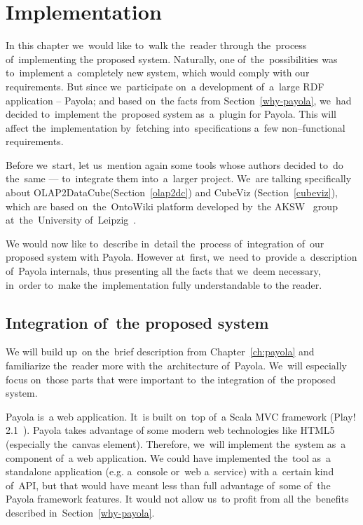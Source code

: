 \chapter{Implementation}
\label{ch:implementation}
In this chapter we~would like to~walk the~reader through the~process of~implementing 
the proposed system. Naturally, one of~the~possibilities was to~implement a~completely new system, 
which would comply with our requirements. But since we~participate on~a development of~a~large RDF
application -- Payola; and based on~the facts from
Section~\ref{why-payola}, we~had decided to~implement the~proposed system as~a~plugin
for Payola. This will affect the~implementation by~fetching into~specifications a~few non--functional
requirements.

Before we~start, let us~mention again some tools whose authors decided to~do the~same --- to~integrate them into~a~larger project. We~are talking specifically about 
OLAP2DataCube(Section~\ref{olap2dc}) and CubeViz (Section~\ref{cubeviz}),
which are based on~the~OntoWiki platform developed by~the AKSW~\cite{aksw} group at~the~University of~Leipzig~\cite{leipzich-uni}.

We would now like to~describe in~detail the~process of~integration of~our proposed system with
Payola. However at~first, we~need to~provide a~description of~Payola internals, thus presenting all
the facts that we~deem necessary, in~order to~make the~implementation fully understandable to
the reader.

\section{Integration of~the proposed system}
We will build up~on the~brief description from Chapter~\ref{ch:payola} and familiarize the~reader
more with the~architecture of~Payola. We~will especially
focus on~those parts that were important to~the integration of~the proposed system.

Payola is~a web application. It~is built on~top of~a Scala MVC framework (Play! 2.1~\cite{playfw}).
Payola takes advantage of
some modern web technologies like HTML5 (especially the~canvas element).
Therefore, we~will implement the~system as~a component of~a web application.
We could have implemented the~tool as~a standalone 
application (e.g. a~console or~web a~service) with a~certain kind of~API,
but that would have meant less than full advantage of~some of~the Payola framework features.
It would not allow us~to profit from all the~benefits described in~Section~\ref{why-payola}. 

